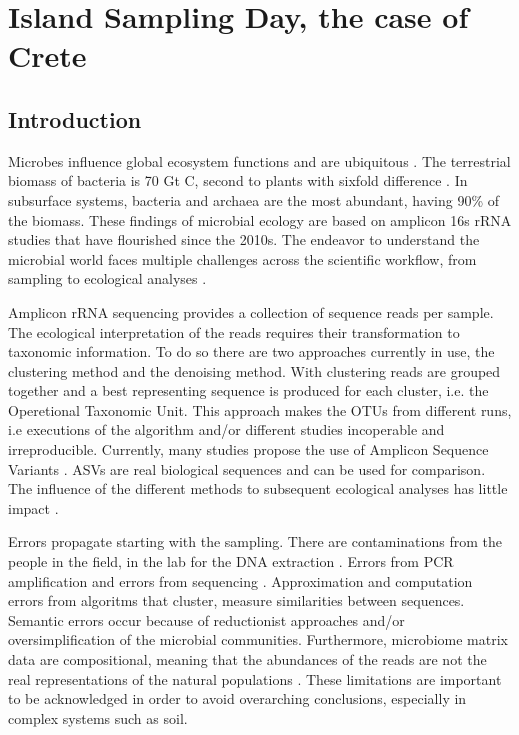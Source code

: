 % 
% 


\chapter{Island Sampling Day, the case of Crete}
\label{cha:isd-crete-soil}


\section{Introduction}\label{intro_isd}

Microbes influence global ecosystem functions \parencite{falkowski2008microbial}
and are ubiquitous \parencite{delgado2016microbial}. The terrestrial biomass of bacteria is
70 Gt C, second to plants with sixfold difference \parencite{bar2018biomass}. In subsurface systems, bacteria and
archaea are the most abundant, having 90\% of the biomass. These findings of microbial
ecology are based on amplicon 16s rRNA studies that have flourished since the
2010s. The endeavor to understand the microbial world faces multiple challenges
across the scientific workflow, from sampling to ecological analyses \parencite{Lee2012}.

Amplicon rRNA sequencing provides a collection of sequence reads per sample. 
The ecological interpretation of the reads requires their transformation to
taxonomic information. To do so there are two approaches currently in use, 
the clustering method and the denoising method. With clustering reads are 
grouped together and a best representing sequence is produced for each 
cluster, i.e. the Operetional Taxonomic Unit. This approach makes the OTUs 
from different runs, i.e executions of the algorithm and/or different studies
incoperable and irreproducible. Currently, many studies propose the use of Amplicon Sequence Variants \parencite{Callahan2017}. 
ASVs are real biological sequences and can be used for comparison.
The influence of the different methods to subsequent ecological analyses has
little impact \parencite{Glassman2018}.

Errors propagate starting with the sampling. There are contaminations from the
people in the field, in the lab for the DNA extraction \parencite{EISENHOFER2019105}. 
Errors from PCR amplification and errors from sequencing \parencite{Schloss2011, Schimer2015}.
Approximation and computation errors from algoritms that cluster, measure similarities between
sequences. Semantic errors occur because of reductionist approaches and/or oversimplification
of the microbial communities. Furthermore, microbiome matrix data are compositional, 
meaning that the abundances of the reads are not the real representations of the natural populations \parencite{Gloor2017}.
These limitations are important to be acknowledged in order to avoid overarching conclusions,
especially in complex systems such as soil.

